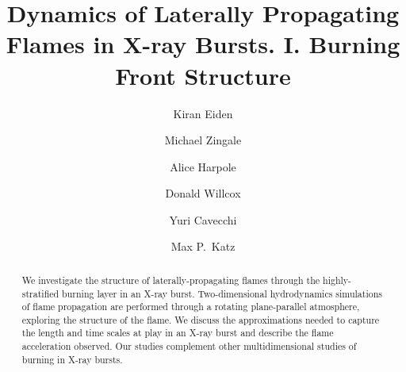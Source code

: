 \documentclass[preprint,times,tighten]{aastex63}
\begin{document}
\title{Dynamics of Laterally Propagating Flames in X-ray Bursts. I. Burning Front Structure}


\author[0000-0001-6191-4285]{Kiran Eiden}

\author[0000-0001-8401-030X]{Michael Zingale}

\author[0000-0002-1530-781X]{Alice Harpole}

\author[0000-0003-2300-5165]{Donald Willcox}

\author[0000-0002-6447-3603]{Yuri Cavecchi}

\author[0000-0003-0439-4556]{Max P.\ Katz}



\begin{abstract}
We investigate the structure of laterally-propagating flames through
the highly-stratified burning layer in an X-ray burst.
Two-dimensional hydrodynamics simulations of flame propagation are
performed through a rotating plane-parallel atmosphere, exploring the
structure of the flame.  We discuss the approximations needed to
capture the length and time scales at play in an X-ray burst and
describe the flame acceleration observed.  Our studies complement
other multidimensional studies of burning in X-ray bursts.
\end{abstract}


\end{document}
